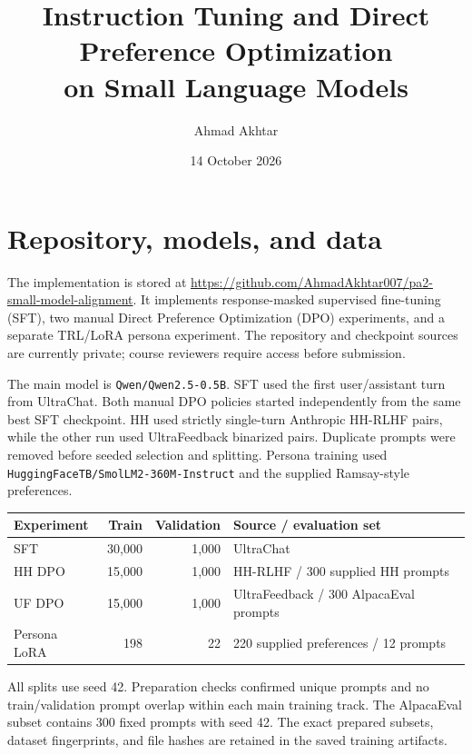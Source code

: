 \documentclass[10pt,a4paper]{article}
\title{Instruction Tuning and Direct Preference Optimization\\on Small Language Models}
\author{Ahmad Akhtar \quad 28100155}
\date{14 October 2026}
\begin{document}
\maketitle
\begin{center}\end{center}

\section{Repository, models, and data}
The implementation is stored at \url{https://github.com/AhmadAkhtar007/pa2-small-model-alignment}. It implements response-masked supervised fine-tuning (SFT), two manual Direct Preference Optimization (DPO) experiments, and a separate TRL/LoRA persona experiment. The repository and checkpoint sources are currently private; course reviewers require access before submission.

The main model is \texttt{Qwen/Qwen2.5-0.5B}. SFT used the first user/assistant turn from UltraChat. Both manual DPO policies started independently from the same best SFT checkpoint. HH used strictly single-turn Anthropic HH-RLHF pairs, while the other run used UltraFeedback binarized pairs. Duplicate prompts were removed before seeded selection and splitting. Persona training used \texttt{HuggingFaceTB/SmolLM2-360M-Instruct} and the supplied Ramsay-style preferences.

\begin{center}
\begin{tabular}{lrrl}\toprule
Experiment & Train & Validation & Source / evaluation set\\\midrule
SFT & 30,000 & 1,000 & UltraChat\\
HH DPO & 15,000 & 1,000 & HH-RLHF / 300 supplied HH prompts\\
UF DPO & 15,000 & 1,000 & UltraFeedback / 300 AlpacaEval prompts\\
Persona LoRA & 198 & 22 & 220 supplied preferences / 12 prompts\\\bottomrule
\end{tabular}
\end{center}
All splits use seed 42. Preparation checks confirmed unique prompts and no train/validation prompt overlap within each main training track. The AlpacaEval subset contains 300 fixed prompts with seed 42. The exact prepared subsets, dataset fingerprints, and file hashes are retained in the saved training artifacts.
\end{document}
